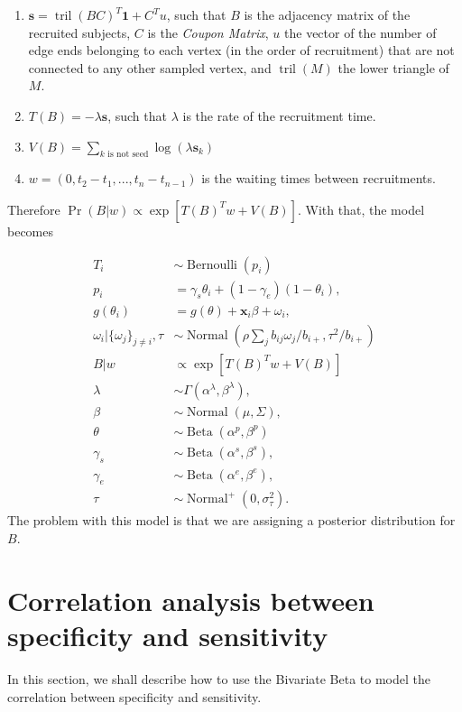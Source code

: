 \documentclass[a4paper, notitlepage, 11pt]{article}
\newcommand{\x}{\boldsymbol{x}}
\newcommand{\N}{\operatorname{Normal}}
\newcommand{\betadist}{\operatorname{Beta}}
\newcommand{\tril}{\operatorname{tril}}
\theoremstyle{definition}
\theoremstyle{remark}
\begin{document}
\begin{enumerate}
  \item $\boldsymbol{s} = \tril(BC)^T \boldsymbol{1} + C^Tu$, such that $B$ is the
  adjacency matrix of the recruited subjects, $C$ is the {\em Coupon Matrix},
  $u$ the vector of the number of edge ends belonging to each vertex
  (in the order of recruitment) that are not connected to any other sampled
  vertex, and $\tril(M)$ the lower triangle of $M$. 

  \item $T(B) = -\lambda \boldsymbol{s}$, such that $\lambda$ is the rate of
  the recruitment time. 

  \item $V(B) = \sum_{k \text{ is not seed}} \log(\lambda \boldsymbol{s}_k)$
  
  \item $w = (0, t_2 - t_1, ..., t_n - t_{n-1})$ is the waiting times between
  recruitments.  
\end{enumerate}

Therefore $\Pr(B|w) \propto \exp[T(B)^Tw + V(B)]$. With that, the model
becomes 

\begin{equation}
  \begin{aligned}
    T_i &\sim \operatorname{Bernoulli}(p_i) \\
    p_i &= \gamma_s\theta_i + (1-\gamma_e)(1 - \theta_i),  \\
    g(\theta_i) &= g(\theta) + \x_i\beta + \omega_i,  \\
    \omega_i|\{\omega_j\}_{j\neq i}, \tau &\sim \N\left(\rho\sum_j b_{ij}\omega_j/b_{i+}, \tau^2/b_{i+}\right) \\
    B|w &\propto \exp[T(B)^Tw + V(B)] \\
    \lambda &\sim \Gamma(\alpha^{\lambda}, \beta^{\lambda}), \\ 
    \beta &\sim \N(\mu, \Sigma), \\ 
    \theta &\sim \betadist(\alpha^p, \beta^p) \\
    \gamma_s &\sim \betadist(\alpha^s, \beta^s), \\
    \gamma_e &\sim \betadist(\alpha^e, \beta^e), \\  
    \tau &\sim \N^+(0,\sigma^2_{\tau}).
  \end{aligned}  
\end{equation}
The problem with this model is that we are assigning a posterior distribution
for $B$.

\section{Correlation analysis between specificity and sensitivity}

In this section, we shall describe how to use the Bivariate Beta
\cite{olkin2015constructions} to model the correlation between specificity and
sensitivity.

 
\end{document}
